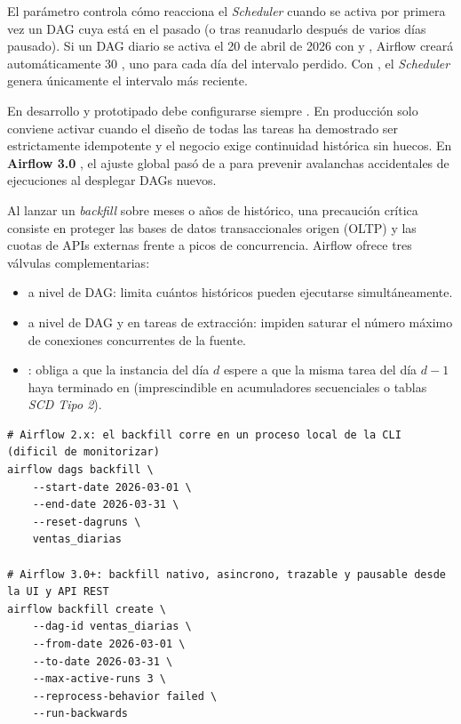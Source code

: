 El parámetro  controla cómo reacciona el \textit{Scheduler} cuando se activa por primera vez un DAG cuya  está en el pasado (o tras reanudarlo después de varios días pausado). Si un DAG diario se activa el 20 de abril de 2026 con  y , Airflow creará automáticamente 30 , uno para cada día del intervalo perdido. Con , el \textit{Scheduler} genera únicamente el intervalo más reciente.

\begin{infobox}
En desarrollo y prototipado debe configurarse siempre . En producción solo conviene activar  cuando el diseño de todas las tareas ha demostrado ser estrictamente idempotente y el negocio exige continuidad histórica sin huecos. En \textbf{Airflow 3.0} , el ajuste global  pasó de  a  para prevenir avalanchas accidentales de ejecuciones al desplegar DAGs nuevos.
\end{infobox}

Al lanzar un \textit{backfill} sobre meses o años de histórico, una precaución crítica consiste en proteger las bases de datos transaccionales origen (OLTP) y las cuotas de APIs externas frente a picos de concurrencia. Airflow ofrece tres válvulas complementarias:
\begin{itemize}
  \item {} a nivel de DAG: limita cuántos  históricos pueden ejecutarse simultáneamente.
  \item {} a nivel de DAG y  en tareas de extracción: impiden saturar el número máximo de conexiones concurrentes de la fuente.
  \item {}: obliga a que la instancia del día $d$ espere a que la misma tarea del día $d-1$ haya terminado en  (imprescindible en acumuladores secuenciales o tablas \textit{SCD Tipo 2}).
\end{itemize}

\begin{lstlisting}[style=bash, caption={Ejecución de backfills: comando síncrono en Airflow 2.x frente a backfill nativo gestionado por el Scheduler en Airflow 3.0+.}, label={lst:backfill-cli}]
# Airflow 2.x: el backfill corre en un proceso local de la CLI (dificil de monitorizar)
airflow dags backfill \
    --start-date 2026-03-01 \
    --end-date 2026-03-31 \
    --reset-dagruns \
    ventas_diarias

# Airflow 3.0+: backfill nativo, asincrono, trazable y pausable desde la UI y API REST
airflow backfill create \
    --dag-id ventas_diarias \
    --from-date 2026-03-01 \
    --to-date 2026-03-31 \
    --max-active-runs 3 \
    --reprocess-behavior failed \
    --run-backwards
\end{lstlisting}

